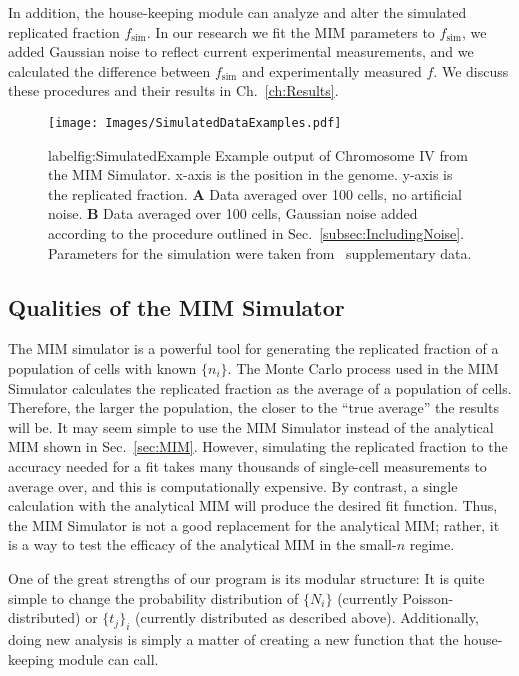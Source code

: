 		In addition, the house-keeping module can analyze and alter the simulated replicated fraction $f_\text{sim}$.
		In our research we fit the MIM parameters to $f_\text{sim}$, we added Gaussian noise to reflect current experimental measurements, and we calculated the difference between $f_\text{sim}$ and experimentally measured $f$.
		We discuss these procedures and their results in Ch.~\ref{ch:Results}.
		
		\begin{figure}[tbh]
			\begin{center}
				\texttt{[image: Images/SimulatedDataExamples.pdf]}
			\end{center}
				\caption[Simulated Replicated Fraction Example]{label{fig:SimulatedExample}
					Example output of Chromosome IV from the MIM Simulator.
					x-axis is the position in the genome.
					y-axis is the replicated fraction.
					\textbf{A} Data averaged over 100 cells, no artificial noise.
					\textbf{B} Data averaged over 100 cells, Gaussian noise added according to the procedure outlined in Sec.~\ref{subsec:IncludingNoise}.
					Parameters for the simulation were taken from~\cite{ScottsPaper} supplementary data.
				}
		\end{figure}	
		
		
		\subsection{Qualities of the MIM Simulator}
		\label{subsec:QualitiesofMIMSimulator}
		
		The MIM simulator is a powerful tool for generating the replicated fraction of a population of cells with known $\{n_i\}$.
		The Monte Carlo process used in the MIM Simulator calculates the replicated fraction as the average of a population of cells.
		Therefore, the larger the population, the closer to the ``true average'' the results will be.
		It may seem simple to use the MIM Simulator instead of the analytical MIM shown in Sec.~\ref{sec:MIM}.
		However, simulating the replicated fraction to the accuracy needed for a fit takes many thousands of single-cell measurements to average over, and this is computationally expensive.
		By contrast, a single calculation with the analytical MIM will produce the desired fit function.
		Thus, the MIM Simulator is not a good replacement for the analytical MIM; rather, it is a way to test the efficacy of the analytical MIM in the small-$n$ regime.
		
		One of the great strengths of our program is its modular structure: It is quite simple to change the probability distribution of $\{N_i\}$ (currently Poisson-distributed) or $\{t_j\}_i$ (currently distributed as described above).
		Additionally, doing new analysis is simply a matter of creating a new function that the house-keeping module can call.
		
